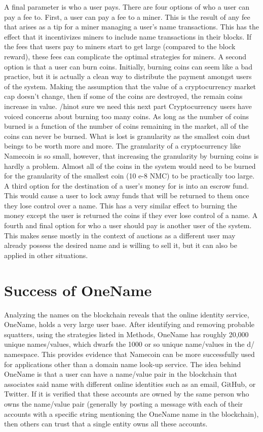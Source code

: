     A final parameter is who a user pays. There are four options of who a user can pay a fee to. First, a user can pay a fee to a miner. This is the result of any fee that arises as a tip for a miner managing a user's name transactions. This has the effect that it incentivizes miners to include name transactions in their blocks. If the fees that users pay to miners start to get large (compared to the block reward), these fees can complicate the optimal strategies for miners. A second option is that a user can burn coins. Initially, burning coins can seem like a bad practice, but it is actually a clean way to distribute the payment amongst users of the system. Making the assumption that the value of a cryptocurrency market cap doesn't change, then if some of the coins are destroyed, the remain coins increase in value. /hi{not sure we need this next part} Cryptocurrency users have voiced concerns about burning too many coins. As long as the number of coins burned is a function of the number of coins remaining in the market, all of the coins can never be burned. What is lost is granularity as the smallest coin dust beings to be worth more and more. The granularity of a cryptocurrency like Namecoin is so small, however, that increasing the granularity by burning coins is hardly a problem. Almost all of the coins in the system would need to be burned for the granularity of the smallest coin (10 e-8 NMC) to be practically too large. A third option for the destination of a user's money for is into an escrow fund. This would cause a user to lock away funds that will be returned to them once they lose control over a name. This has a very similar effect to burning the money except the user is returned the coins if they ever lose control of a name. A fourth and final option for who a user should pay is another user of the system. This makes sense mostly in the context of auctions as a different user may already possess the desired name and is willing to sell it, but it can also be applied in other situations.



\section{Success of OneName}
    Analyzing the names on the blockchain reveals that the online identity service, OneName, holds a very large user base. After identifying and removing probable squatters, using the strategies listed in Methods, OneName has roughly 20,000 unique names/values, which dwarfs the 1000 or so unique name/values in the d/ namespace. This provides evidence that Namecoin can be more successfully used for applications other than a domain name look-up service. The idea behind OneName is that a user can have a name/value pair in the blockchain that associates said name with different online identities such as an email, GitHub, or Twitter. If it is verified that these accounts are owned by the same person who owns the name/value pair (generally by posting a message with each of their accounts with a specific string mentioning the OneName name in the blockchain), then others can trust that a single entity owns all these accounts. 

